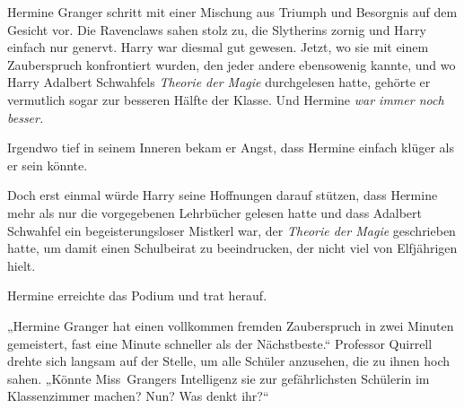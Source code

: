 Hermine Granger schritt mit einer Mischung aus Triumph und Besorgnis auf dem Gesicht vor. Die Ravenclaws sahen stolz zu, die Slytherins zornig und Harry einfach nur genervt. Harry war diesmal gut gewesen. Jetzt, wo sie mit einem Zauberspruch konfrontiert wurden, den jeder andere ebensowenig kannte, und wo Harry Adalbert Schwahfels \emph{Theorie der Magie} durchgelesen hatte, gehörte er vermutlich sogar zur besseren Hälfte der Klasse. Und Hermine \emph{war immer noch besser.}

Irgendwo tief in seinem Inneren bekam er Angst, dass Hermine einfach klüger als er sein könnte.

Doch erst einmal würde Harry seine Hoffnungen darauf stützen, dass Hermine mehr als nur die vorgegebenen Lehrbücher gelesen hatte und dass Adalbert Schwahfel ein begeisterungsloser Mistkerl war, der \emph{Theorie der Magie} geschrieben hatte, um damit einen Schulbeirat zu beeindrucken, der nicht viel von Elfjährigen hielt.

Hermine erreichte das Podium und trat herauf.

„Hermine Granger hat einen vollkommen fremden Zauberspruch in zwei Minuten gemeistert, fast eine Minute schneller als der Nächstbeste.“ Professor Quirrell drehte sich langsam auf der Stelle, um alle Schüler anzusehen, die zu ihnen hoch sahen. „Könnte Miss~Grangers Intelligenz sie zur gefährlichsten Schülerin im Klassenzimmer machen? Nun? Was denkt ihr?“

